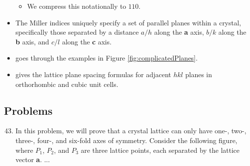 \documentclass[../notes.tex]{subfiles}
\begin{document}
\begin{itemize}
\begin{itemize}
        \item We compress this notationally to $110$.
    \end{itemize}
    \item The Miller indices uniquely specify a set of parallel planes within a crystal, specifically those separated by a distance $a/h$ along the \textbf{a} axis, $b/k$ along the \textbf{b} axis, and $c/l$ along the \textbf{c} axis.
    \item \textcite{bib:McQuarrieSimon} goes through the examples in Figure \ref{fig:complicatedPlanes}.
    \item \textcite{bib:McQuarrieSimon} gives the lattice plane spacing formulas for adjacent $hkl$ planes in orthorhombic and cubic unit cells.
\end{itemize}


\subsection*{Problems}
\begin{enumerate}[label={\textbf{31-\arabic*.}},ref={31-\arabic*},leftmargin=3.5em]
    \setcounter{enumi}{42}
    \item \label{prb:31-43}In this problem, we will prove that a crystal lattice can only have one-, two-, three-, four-, and six-fold axes of symmetry. Consider the following figure, where $P_1$, $P_2$, and $P_3$ are three lattice points, each separated by the lattice vector \textbf{a}.
    ...
\end{enumerate}
\end{document}
